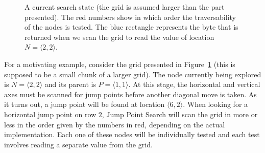 \begin{figure}[tb]
  \caption{\small 
A current search state (the grid is assumed larger than the part presented).
The red numbers show in which order the traversability of the nodes is tested.
The blue rectangle represents the byte that is returned when we scan the
grid to read the value of location $N = \langle 2, 2\rangle$.
}
  \label{fig::gridforblocks}
\end{figure}

For a motivating example, consider the grid presented in 
Figure~\ref{fig::gridforblocks} 
(this is supposed to be a small chunk of a larger grid).  
The node currently being explored is $N = \langle 2,2\rangle$ 
and its parent is $P = \langle 1,1\rangle$.  
At this stage, the horizontal and vertical axes must be scanned 
for jump points before another diagonal move is taken.  
As it turns out, a jump point will be found at location $\langle 6,2\rangle$.  
When looking for a horizontal jump point on row $2$, Jump Point Search will 
scan the grid in more or less in the order given by the numbers in red, 
depending on the actual implementation.  
Each one of these nodes will be individually tested and each test
involves reading a separate value from the grid.

